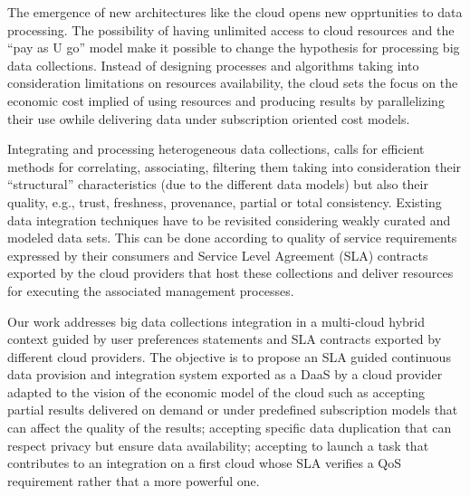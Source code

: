 The emergence of new architectures like the cloud opens new opprtunities to data processing. 
The possibility of having unlimited access to cloud resources and the ``pay as U go'' model make it possible to change the hypothesis for processing big  data collections. 
Instead of designing processes and algorithms taking into consideration  limitations on resources availability, the cloud sets the focus on the economic cost implied of using resources and producing results by parallelizing their use owhile delivering data under subscription oriented cost models.
 
Integrating and processing heterogeneous data collections, calls for efficient methods for correlating, associating, filtering them taking into consideration their ``structural'' characteristics (due to the different data models) but also their quality, e.g., trust, freshness, provenance, partial or total consistency. 
Existing data integration techniques have to be revisited considering weakly curated and modeled data sets. This can be done according to quality of service requirements expressed by their consumers and Service Level Agreement (SLA) contracts exported by the cloud providers that host  these collections and deliver resources for executing the associated management processes.


Our work addresses big data collections integration  in a multi-cloud hybrid context guided by user preferences statements and SLA contracts exported by different cloud providers. The objective is to propose an SLA guided continuous data provision and integration system exported as a DaaS by a cloud provider adapted to the vision of the economic model of the cloud such as accepting partial results delivered on demand or under predefined subscription models that can affect the quality of the results; accepting specific data duplication that can respect privacy but ensure data availability; accepting to launch a task that contributes to an integration on a first cloud whose SLA verifies a QoS requirement rather that a more powerful one.  

